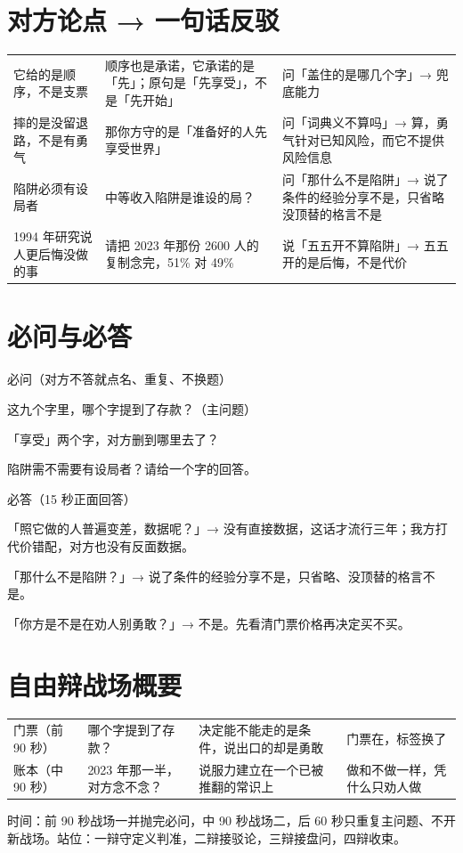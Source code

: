 \documentclass[quick,pro]{debate}
\begin{document}
\section{对方论点 → 一句话反驳}
\begin{tabularx}{\linewidth}{@{}Y Y Y@{}}\toprule
{}&&\\\midrule
它给的是顺序，不是支票&顺序也是承诺，它承诺的是「先」；原句是「先享受」，不是「先开始」&问「盖住的是哪几个字」→ 兜底能力\\
摔的是没留退路，不是有勇气&那你方守的是「准备好的人先享受世界」&问「词典义不算吗」→ 算，勇气针对已知风险，而它不提供风险信息\\
陷阱必须有设局者&中等收入陷阱是谁设的局？&问「那什么不是陷阱」→ 说了条件的经验分享不是，只省略没顶替的格言不是\\
1994 年研究说人更后悔没做的事&请把 2023 年那份 2600 人的复制念完，51\% 对 49\%&说「五五开不算陷阱」→ 五五开的是后悔，不是代价\\
\bottomrule\end{tabularx}

\section{必问与必答}
\begin{points}{必问（对方不答就点名、重复、不换题）}
\item 这九个字里，哪个字提到了存款？（主问题）
\item 「享受」两个字，对方删到哪里去了？
\item 陷阱需不需要有设局者？请给一个字的回答。
\end{points}
\begin{points}{必答（15 秒正面回答）}
\item 「照它做的人普遍变差，数据呢？」→ 没有直接数据，这话才流行三年；我方打代价错配，对方也没有反面数据。
\item 「那什么不是陷阱？」→ 说了条件的经验分享不是，只省略、没顶替的格言不是。
\item 「你方是不是在劝人别勇敢？」→ 不是。先看清门票价格再决定买不买。
\end{points}

\section{自由辩战场概要}
\begin{tabularx}{\linewidth}{@{}L{4.2em}Y Y Y@{}}\toprule
{}&&&\\\midrule
门票（前 90 秒）&哪个字提到了存款？&决定能不能走的是条件，说出口的却是勇敢&门票在，标签换了\\
账本（中 90 秒）&2023 年那一半，对方念不念？&说服力建立在一个已被推翻的常识上&做和不做一样，凭什么只劝人做\\
\bottomrule\end{tabularx}
时间：前 90 秒战场一并抛完必问，中 90 秒战场二，后 60 秒只重复主问题、不开新战场。站位：一辩守定义判准，二辩接驳论，三辩接盘问，四辩收束。
\end{document}
